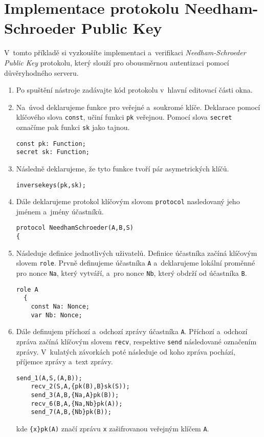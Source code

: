 \section{Implementace protokolu Needham-Schroeder Public Key}
V~tomto příkladě si vyzkoušíte implementaci a~verifikaci \emph{Needham-Schroeder Public Key}
protokolu, který slouží pro obousměrnou autentizaci pomocí důvěryhodného serveru.

\begin{enumerate}
  \item Po spuštění nástroje zadávajte kód protokolu v~hlavní editovací části okna.

  \item Na~úvod deklarujeme funkce pro veřejné a~soukromé klíče. Deklarace pomocí klíčového slova \texttt{const},
  učiní funkci \texttt{pk} veřejnou. Pomocí slova \texttt{secret} označíme pak funkci \texttt{sk} jako tajnou.
  \begin{lstlisting}[name=NSPK]
const pk: Function;
secret sk: Function;
  \end{lstlisting}

  \item Následně deklarujeme, že tyto funkce tvoří pár asymetrických klíčů.
  \begin{lstlisting}[name=NSPK]
inversekeys(pk,sk);
  \end{lstlisting}

  \item Dále deklarujeme protokol klíčovým slovom \texttt{protocol} nasledovaný jeho jménem a~jmény účastníků.
  \begin{lstlisting}[name=NSPK]
protocol NeedhamSchroeder(A,B,S)
{
  \end{lstlisting}

  \item Následuje definice jednotlivých uživatelů. Definice účastníka začíná klíčovým slovem \texttt{role}.
  Prvně definujeme účastníka \texttt{A} a~deklarujeme lokální proměnné pro nonce \texttt{Na}, který
  vytváří, a~pro nonce \texttt{Nb}, který obdrží od účastníka \texttt{B}.
  \begin{lstlisting}[name=NSPK]
  role A
  {
    const Na: Nonce;
    var Nb: Nonce;
  \end{lstlisting}

  \item Dále definujem příchozí a~odchozí zprávy účastníka \texttt{A}.
  Příchozí a~odchozí zpráva začíná klíčovým slovem \texttt{recv}, respektive \texttt{send} následované označením zprávy.
  V~kulatých závorkách poté následuje od koho zpráva pochází, příjemce zprávy a~text zprávy.
  \begin{lstlisting}[name=NSPK]
    send_1(A,S,(A,B));
    recv_2(S,A,{pk(B),B}sk(S));
    send_3(A,B,{Na,A}pk(B));
    recv_6(B,A,{Na,Nb}pk(A));
    send_7(A,B,{Nb}pk(B));
  \end{lstlisting}
  kde \texttt{\{x\}pk(A)} značí zprávu \texttt{x} zašifrovanou veřejným klíčem \texttt{A}.


\end{enumerate}
